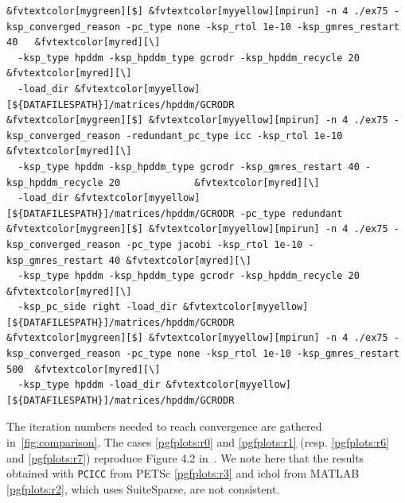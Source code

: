 \documentclass[3p,11pt]{elsarticle}
\newcommand{\pk}[1]{\texttt{#1}}
\begin{document}
\begin{Verbatim}[fontsize=\footnotesize,frame=single,framerule=0.1mm,commandchars=&\[\]]
&fvtextcolor[mygreen][$] &fvtextcolor[myyellow][mpirun] -n 4 ./ex75 -ksp_converged_reason -pc_type none -ksp_rtol 1e-10 -ksp_gmres_restart 40   &fvtextcolor[myred][\]
  -ksp_type hpddm -ksp_hpddm_type gcrodr -ksp_hpddm_recycle 20                                   &fvtextcolor[myred][\]
  -load_dir &fvtextcolor[myyellow][${DATAFILESPATH}]/matrices/hpddm/GCRODR
&fvtextcolor[mygreen][$] &fvtextcolor[myyellow][mpirun] -n 4 ./ex75 -ksp_converged_reason -redundant_pc_type icc -ksp_rtol 1e-10                &fvtextcolor[myred][\]
  -ksp_type hpddm -ksp_hpddm_type gcrodr -ksp_gmres_restart 40 -ksp_hpddm_recycle 20             &fvtextcolor[myred][\]
  -load_dir &fvtextcolor[myyellow][${DATAFILESPATH}]/matrices/hpddm/GCRODR -pc_type redundant
&fvtextcolor[mygreen][$] &fvtextcolor[myyellow][mpirun] -n 4 ./ex75 -ksp_converged_reason -pc_type jacobi -ksp_rtol 1e-10 -ksp_gmres_restart 40 &fvtextcolor[myred][\]
  -ksp_type hpddm -ksp_hpddm_type gcrodr -ksp_hpddm_recycle 20                                   &fvtextcolor[myred][\]
  -ksp_pc_side right -load_dir &fvtextcolor[myyellow][${DATAFILESPATH}]/matrices/hpddm/GCRODR
&fvtextcolor[mygreen][$] &fvtextcolor[myyellow][mpirun] -n 4 ./ex75 -ksp_converged_reason -pc_type none -ksp_rtol 1e-10 -ksp_gmres_restart 500  &fvtextcolor[myred][\]
  -ksp_type hpddm -load_dir &fvtextcolor[myyellow][${DATAFILESPATH}]/matrices/hpddm/GCRODR
\end{Verbatim}
The iteration numbers
needed to reach convergence are gathered in~\cref{fig:comparison}.  The
cases \ref{pgfplots:r0} and
\ref{pgfplots:r1} (resp. \ref{pgfplots:r6} and \ref{pgfplots:r7}) reproduce Figure 4.2 in~\cite{parks2006recycling}.
We note here that the results obtained with
\pk{PCICC} from PETSc \ref{pgfplots:r3} and ichol from MATLAB \ref{pgfplots:r2}, which uses SuiteSparse, are not consistent.
\end{document}
